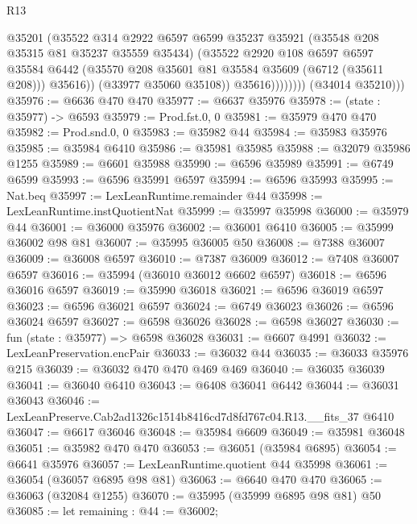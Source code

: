 \begin{lexlean}{R13}
\begin{coremodule}
                          @35201
                          (@35522
                            @314
                            @2922
                            @6597
                            @6599
                            @35237
                            @35921
                            (@35548 @208 @35315 @81 @35237 @35559 @35434)
                            (@35522
                              @2920
                              @108
                              @6597
                              @6597
                              @35584
                              @6442
                              (@35570 @208 @35601 @81 @35584 @35609 (@6712 (@35611 @208)))
                              @35616))
                          (@33977 @35060 @35108))
                        @35616))))))))
        (@34014 @35210)))
@35976 := @6636 @470 @470
@35977 := @6637 @35976
@35978 := (state : @35977) -> @6593
@35979 := Prod.fst.{0, 0}
@35981 := @35979 @470 @470
@35982 := Prod.snd.{0, 0}
@35983 := @35982 @44
@35984 := @35983 @35976
@35985 := @35984 @6410
@35986 := @35981 @35985
@35988 := @32079 @35986 @1255
@35989 := @6601 @35988
@35990 := @6596 @35989
@35991 := @6749 @6599
@35993 := @6596 @35991 @6597
@35994 := @6596 @35993
@35995 := Nat.beq
@35997 := LexLeanRuntime.remainder @44
@35998 := LexLeanRuntime.instQuotientNat
@35999 := @35997 @35998
@36000 := @35979 @44
@36001 := @36000 @35976
@36002 := @36001 @6410
@36005 := @35999 @36002 @98 @81
@36007 := @35995 @36005 @50
@36008 := @7388 @36007
@36009 := @36008 @6597
@36010 := @7387 @36009
@36012 := @7408 @36007 @6597
@36016 := @35994 (@36010 @36012 @6602 @6597)
@36018 := @6596 @36016 @6597
@36019 := @35990 @36018
@36021 := @6596 @36019 @6597
@36023 := @6596 @36021 @6597
@36024 := @6749 @36023
@36026 := @6596 @36024 @6597
@36027 := @6598 @36026
@36028 := @6598 @36027
@36030 := fun (state : @35977) => @6598 @36028
@36031 := @6607 @4991
@36032 := LexLeanPreservation.encPair
@36033 := @36032 @44
@36035 := @36033 @35976 @215
@36039 := @36032 @470 @470 @469 @469
@36040 := @36035 @36039
@36041 := @36040 @6410
@36043 := @6408 @36041 @6442
@36044 := @36031 @36043
@36046 := LexLeanPreserve.Cab2ad1326c1514b8416cd7d8fd767c04.R13.__fits_37 @6410
@36047 := @6617 @36046
@36048 := @35984 @6609
@36049 := @35981 @36048
@36051 := @35982 @470 @470
@36053 := @36051 (@35984 @6895)
@36054 := @6641 @35976
@36057 := LexLeanRuntime.quotient @44 @35998
@36061 := @36054 (@36057 @6895 @98 @81)
@36063 := @6640 @470 @470
@36065 := @36063 (@32084 @1255)
@36070 := @35995 (@35999 @6895 @98 @81) @50
@36085 := let remaining : @44 := @36002;

\end{coremodule}
\end{lexlean}
